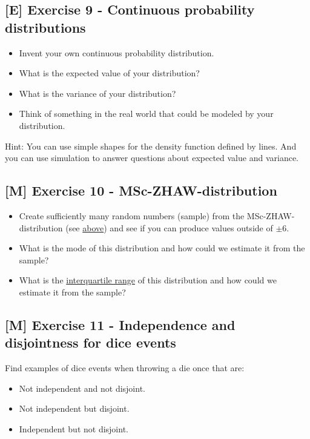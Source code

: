 \documentclass[
]{book}
\providecommand{\tightlist}{%
  \setlength{\itemsep}{0pt}\setlength{\parskip}{0pt}}
\begin{document}
\subsection{{[}E{]} Exercise 9 - Continuous probability distributions}\label{exercise9}

\begin{itemize}
\tightlist
\item
  Invent your own continuous probability distribution.
\item
  What is the expected value of your distribution?
\item
  What is the variance of your distribution?
\item
  Think of something in the real world that could be modeled by your distribution.
\end{itemize}

Hint: You can use simple shapes for the density function defined by lines. And you can use simulation to answer questions about expected value and variance.

\subsection{{[}M{]} Exercise 10 - MSc-ZHAW-distribution}\label{exercise10}

\begin{itemize}
\tightlist
\item
  Create sufficiently many random numbers (sample) from the MSc-ZHAW-distribution (see \hyperref[discrete_probability_distributions]{above})
  and see if you can produce values outside of \(\pm 6\).
\item
  What is the mode of this distribution and how could we estimate it from the sample?
\item
  What is the \href{https://en.wikipedia.org/wiki/Interquartile_range}{interquartile range} of this distribution and how could we estimate it from the sample?
\end{itemize}

\subsection{{[}M{]} Exercise 11 - Independence and disjointness for dice events}\label{exercise11}

Find examples of dice events when throwing a die once that are:

\begin{itemize}
\tightlist
\item
  Not independent and not disjoint.
\item
  Not independent but disjoint.
\item
  Independent but not disjoint.
\end{itemize}
\end{document}
